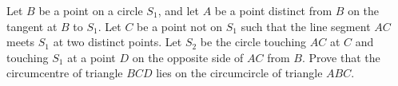 Let $B$ be a point on a circle $S_1$,  and let $A$ be a point distinct from $B$ on the tangent at $B$ to $S_1$. Let $C$ be a point not on $S_1$ such that the line segment $AC$ meets $S_1$ at two distinct points. Let $S_2$ be the circle touching $AC$ at $C$ and touching $S_1$ at a point $D$ on the opposite side of $AC$ from $B$.  Prove that the circumcentre of triangle $BCD$ lies on the circumcircle of triangle $ABC$.